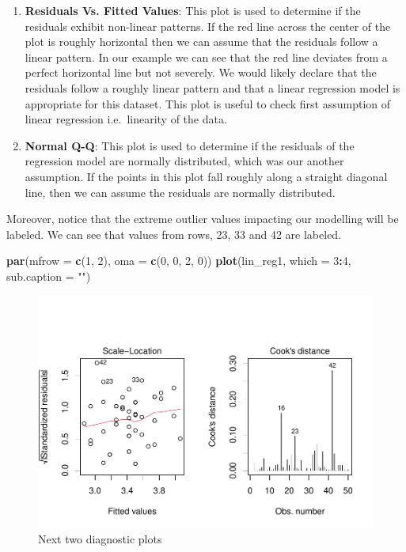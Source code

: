 \documentclass[
]{book}
\newenvironment{Shaded}{\begin{snugshade}}{\end{snugshade}}
\newcommand{\AttributeTok}[1]{\textcolor[rgb]{0.13,0.29,0.53}{#1}}
\newcommand{\DecValTok}[1]{\textcolor[rgb]{0.00,0.00,0.81}{#1}}
\newcommand{\FunctionTok}[1]{\textcolor[rgb]{0.13,0.29,0.53}{\textbf{#1}}}
\newcommand{\NormalTok}[1]{#1}
\newcommand{\SpecialCharTok}[1]{\textcolor[rgb]{0.81,0.36,0.00}{\textbf{#1}}}
\newcommand{\StringTok}[1]{\textcolor[rgb]{0.31,0.60,0.02}{#1}}
\providecommand{\tightlist}{%
  \setlength{\itemsep}{0pt}\setlength{\parskip}{0pt}}
\begin{document}
\begin{enumerate}
\def\labelenumi{\arabic{enumi}.}
\tightlist
\item
  \textbf{Residuals Vs. Fitted Values}: This plot is used to determine if the residuals exhibit non-linear patterns. If the red line across the center of the plot is roughly horizontal then we can assume that the residuals follow a linear pattern. In our example we can see that the red line deviates from a perfect horizontal line but not severely. We would likely declare that the residuals follow a roughly linear pattern and that a linear regression model is appropriate for this dataset. This plot is useful to check first assumption of linear regression i.e.~linearity of the data.
\item
  \textbf{Normal Q-Q}: This plot is used to determine if the residuals of the regression model are normally distributed, which was our another assumption. If the points in this plot fall roughly along a straight diagonal line, then we can assume the residuals are normally distributed.
\end{enumerate}

Moreover, notice that the extreme outlier values impacting our modelling will be labeled. We can see that values from rows, 23, 33 and 42 are labeled.

\begin{Shaded}
\begin{Highlighting}[]
\FunctionTok{par}\NormalTok{(}\AttributeTok{mfrow =} \FunctionTok{c}\NormalTok{(}\DecValTok{1}\NormalTok{, }\DecValTok{2}\NormalTok{), }\AttributeTok{oma =} \FunctionTok{c}\NormalTok{(}\DecValTok{0}\NormalTok{, }\DecValTok{0}\NormalTok{, }\DecValTok{2}\NormalTok{, }\DecValTok{0}\NormalTok{))}
\FunctionTok{plot}\NormalTok{(lin\_reg1, }\AttributeTok{which =} \DecValTok{3}\SpecialCharTok{:}\DecValTok{4}\NormalTok{, }\AttributeTok{sub.caption =} \StringTok{""}\NormalTok{)}
\end{Highlighting}
\end{Shaded}

\begin{figure}

{\centering \includegraphics[height=0.4\textheight]{DauR_files/figure-latex/plots2-1} 

}

\caption{Next two diagnostic plots}\label{fig:plots2}
\end{figure}
\end{document}
